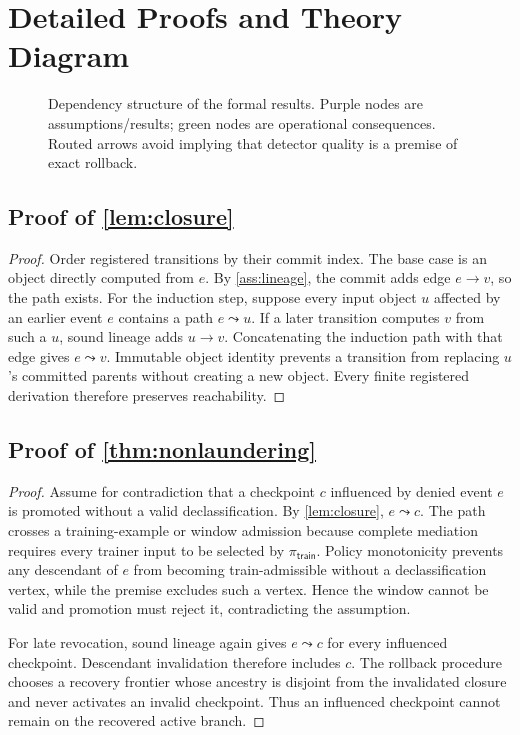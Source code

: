 \section{Detailed Proofs and Theory Diagram}
\label{app:proofs}

\begin{figure}[t]
  \centering
  \resizebox{\columnwidth}{!}{}
  \caption{Dependency structure of the formal results. Purple nodes are assumptions/results; green nodes are operational consequences. Routed arrows avoid implying that detector quality is a premise of exact rollback.}
  \label{fig:theory}
\end{figure}

\subsection{Proof of \cref{lem:closure}}

\begin{proof}
Order registered transitions by their commit index. The base case is an object directly computed from $e$. By \cref{ass:lineage}, the commit adds edge $e\rightarrow v$, so the path exists. For the induction step, suppose every input object $u$ affected by an earlier event $e$ contains a path $e\leadsto u$. If a later transition computes $v$ from such a $u$, sound lineage adds $u\rightarrow v$. Concatenating the induction path with that edge gives $e\leadsto v$. Immutable object identity prevents a transition from replacing $u$'s committed parents without creating a new object. Every finite registered derivation therefore preserves reachability.
\end{proof}

\subsection{Proof of \cref{thm:nonlaundering}}

\begin{proof}
Assume for contradiction that a checkpoint $c$ influenced by denied event $e$ is promoted without a valid declassification. By \cref{lem:closure}, $e\leadsto c$. The path crosses a training-example or window admission because complete mediation requires every trainer input to be selected by $\pi_{\mathsf{train}}$. Policy monotonicity prevents any descendant of $e$ from becoming train-admissible without a declassification vertex, while the premise excludes such a vertex. Hence the window cannot be valid and promotion must reject it, contradicting the assumption.

For late revocation, sound lineage again gives $e\leadsto c$ for every influenced checkpoint. Descendant invalidation therefore includes $c$. The rollback procedure chooses a recovery frontier whose ancestry is disjoint from the invalidated closure and never activates an invalid checkpoint. Thus an influenced checkpoint cannot remain on the recovered active branch.
\end{proof}

